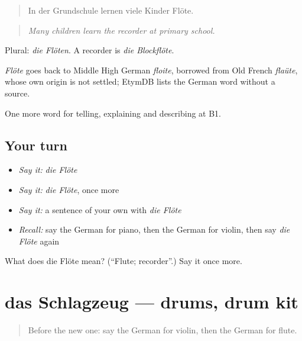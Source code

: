 \begin{quote}
In der Grundschule lernen viele Kinder Flöte.
\end{quote}

\begin{quote}
\emph{Many children learn the recorder at primary school.}
\end{quote}

Plural: \emph{die Flöten}. A recorder is \emph{die Blockflöte}.

\begin{cousinweb}
\emph{Flöte} goes back to Middle High German \emph{floite}, borrowed from Old French \emph{flaüte}, whose own origin is not settled; EtymDB lists the German word without a source.
\end{cousinweb}

\begin{grammarlens}[title={What you've built}]
One more word for telling, explaining and describing at B1.
\end{grammarlens}

\subsection*{Your turn}
\begin{itemize}
\raggedright
  \item \emph{Say it:} \emph{die Flöte}
  \item \emph{Say it:} \emph{die Flöte}, once more
  \item \emph{Say it:} a sentence of your own with \emph{die Flöte}
  \item \emph{Recall:} say the German for piano, then the German for violin, then say \emph{die Flöte} again
\end{itemize}

\begin{tcolorbox}[breakable,colback=teal!4,colframe=teal!35!black,title={Before you move on}]
What does die Flöte mean? (\textquotedblleft{}Flute; recorder\textquotedblright{}.) Say it once more.
\end{tcolorbox}
\section[das Schlagzeug]{das Schlagzeug — drums, drum kit}

\label{lesson:GE-C513-schlagzeug}



\begin{quote}
Before the new one: say the German for violin, then the German for flute.
\end{quote}

